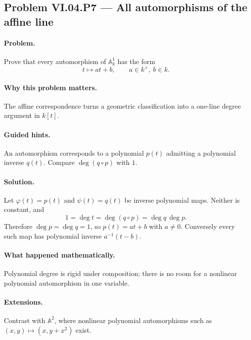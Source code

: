 \subsection*{Problem VI.04.P7 --- All automorphisms of the affine line}
\label{prob:vi04-p7}
\paragraph{Problem.}
Prove that every automorphism of \(\mathbb A_k^1\) has the form
\[
t\longmapsto at+b,
\qquad a\in k^\times,\ b\in k.
\]
\ifdefined\FullProblemDossiers
\paragraph{Why this problem matters.}  The affine correspondence turns a geometric
classification into a one-line degree argument in \(k[t]\).
\paragraph{Guided hints.}  An automorphism corresponds to a polynomial \(p(t)\) admitting a
polynomial inverse \(q(t)\).  Compare \(\deg(q\circ p)\) with \(1\).
\paragraph{Solution.}
Let \(\varphi(t)=p(t)\) and \(\psi(t)=q(t)\) be inverse polynomial maps.  Neither is
constant, and
\[
1=\deg t=\deg(q\circ p)=\deg q\,\deg p.
\]
Therefore \(\deg p=\deg q=1\), so \(p(t)=at+b\) with \(a\neq0\).  Conversely every such
map has polynomial inverse \(a^{-1}(t-b)\).
\paragraph{What happened mathematically.}  Polynomial degree is rigid under composition;
there is no room for a nonlinear polynomial automorphism in one variable.
\paragraph{Extensions.}  Contrast with \(\mathbb A^2\), where nonlinear polynomial
automorphisms such as \((x,y)\mapsto(x,y+x^2)\) exist.
\fi
